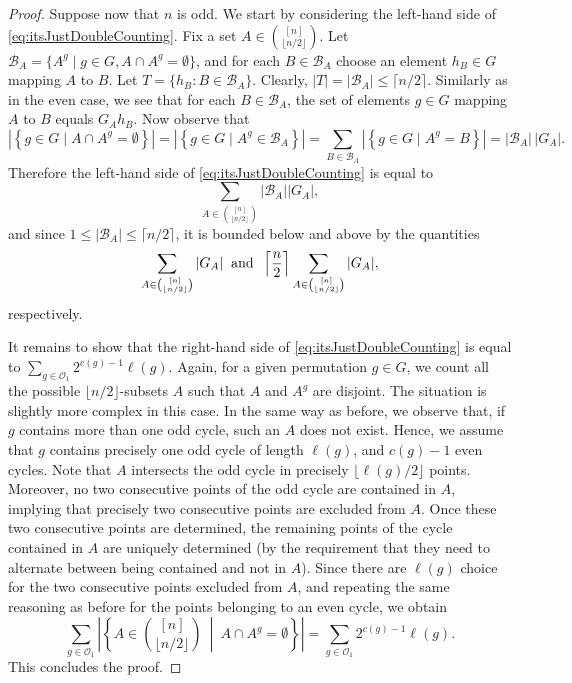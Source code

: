 \documentclass[a4paper]{amsart}
\theoremstyle{definition}
\begin{document}
\begin{proof}
    Suppose now that $n$ is odd.
   We start by considering the left-hand side of \cref{eq:itsJustDoubleCounting}.
    Fix
    a set $A\in {[n] \choose \lfloor n/2\rfloor}$.
    Let ${\mathcal B}_A = \{A^g \mid g\in G, A \cap A^g = \emptyset\}$, and for each $B \in {\mathcal B}_A$ choose an element $h_B\in G$ mapping $A$ to $B$. Let $T = \{h_B : B \in {\mathcal B}_A\}$. Clearly, $|T| = |{\mathcal B}_A| \le \lceil n/2 \rceil$.
    Similarly as in the even case, we see
    that for each $B\in {\mathcal B}_A$, the set of elements $g\in G$ mapping $A$ to $B$ equals $G_A h_B$. Now observe that
    $$
    \left| \left\lbrace g \in G \mid A\cap A^g  = \emptyset  \right\rbrace \right|
    =
    \left| \left\lbrace g \in G \mid A^g  \in {\mathcal B}_A  \right\rbrace \right|
    =
    \sum_{B\in {\mathcal B}_A}
    \left| \left\lbrace g \in G \mid A^g = B   \right\rbrace \right|
    =
    |{\mathcal B}_A|\,|G_A|.
    $$
    Therefore
    the left-hand side of \cref{eq:itsJustDoubleCounting}
    is equal to
    $$\sum_{A \in {[n] \choose \lfloor n/2 \rfloor}} |{\mathcal B}_A| |G_A|, $$
    and since $1\le |{\mathcal B_A}| \le  \lceil n/2 \rceil$, it is bounded below and above by the quantities 
    \[ \sum_{A \in {[n] \choose \lfloor n/2\rfloor }} |G_A|\> \hbox{ and } \> %
    \left\lceil \frac{n}{2} \right\rceil\sum_{A \in {[n] \choose \lfloor n/2\rfloor }} |G_A|,\]
    respectively.

    It remains to show that the right-hand side of \cref{eq:itsJustDoubleCounting} is equal to $\sum_{g \in \mathcal{O}_1}2^{c(g)-1}\ell(g)$.
    Again, for a given permutation $g\in G$, we count all the possible $\lfloor n/2 \rfloor$-subsets $A$ such that $A$ and $A^g$ are disjoint. The situation is slightly more complex in this case. In the same way as before, we observe that, if $g$ contains more than one odd cycle, such an $A$ does not exist. Hence, we assume that $g$ contains precisely one odd cycle of length $\ell(g)$, and $c(g)-1$ even cycles. Note that $A$ intersects the odd cycle in precisely $\lfloor \ell(g)/2 \rfloor$ points. Moreover, no two consecutive points of the odd cycle are contained in $A$, implying that precisely two consecutive points are excluded from $A$. Once these two consecutive points are determined, the remaining points of the cycle contained in $A$ are uniquely determined (by the requirement that they need to alternate between being contained and not in $A$). Since there are $\ell(g)$ choice for the two consecutive points excluded from $A$, and repeating the same reasoning as before for the points belonging to an even cycle, we obtain
    \[ \sum_{g\in \mathcal{O}_1} \left| \left\lbrace A \in {[n] \choose \lfloor n/2\rfloor} \> \middle\vert \> A\cap A^g = \emptyset  \right\rbrace \right| = \sum_{g\in  \mathcal{O}_1} 2^{c(g)-1}\ell(g) . \]
    This concludes the proof.
\end{proof}
\end{document}
